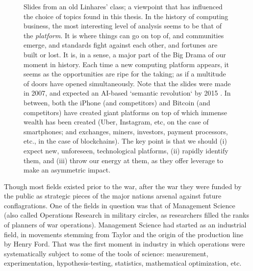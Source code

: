 \begin{figure}[!p]

\caption{Slides from an old Linhares' class; a viewpoint that has influenced the choice of topics found in this thesis.   In the history of computing business, the most interesting level of analysis seems to be that of the \emph{platform}.  It is where things can go on top of, and communities emerge, and standards fight against each other, and fortunes are built or lost.  It is, in a sense, a major part of the Big Drama of our moment in history. Each time a new computing platform appears, it seems as the opportunities are ripe for the taking; as if a multitude of doors have opened simultaneously.  Note that the slides were made in 2007, and expected an AI-based `semantic revolution` by 2015 \citep{only-one-life}.  In between, both the iPhone (and competitors) and Bitcoin (and competitors) have created giant platforms on top of which immense wealth has been created (Uber, Instagram, etc, on the case of smartphones; and exchanges, miners, investors, payment processors, etc., in the case of blockchains).  The key point is that we should (i) expect new, unforeseen, technological platforms, (ii) rapidly identify them, and (iii) throw our energy at them, as they offer leverage to make an asymmetric impact.
\label{fig:onelife}}
\end{figure}

Though most fields existed prior to the war, after the war they were funded by the public as strategic pieces of the major nations arsenal against future conflagrations. One of the fields in question was that of Management Science (also called Operations Research in military circles, as researchers filled the ranks of planners of war operations). Management Science had started as an industrial field, in movements stemming from Taylor and the origin of the production line by Henry Ford.  That was the first moment in industry in which operations were systematically subject to some of the tools of science: measurement, experimentation, hypothesis-testing, statistics, mathematical optimization, etc.

